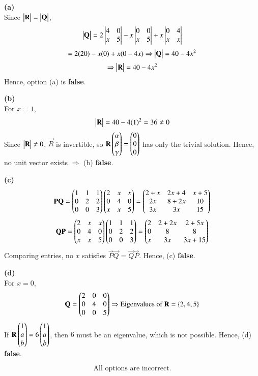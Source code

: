 \documentclass[journal]{IEEEtran}
\begin{document}
\textbf{(a)}\\[-2mm]
Since $\begin{vmatrix}\mathbf{R}\end{vmatrix}=\begin{vmatrix}\mathbf{Q}\end{vmatrix}$,  
\[
\begin{vmatrix}\mathbf{Q}\end{vmatrix} =
2\begin{vmatrix}4 & 0\\ x & 5\end{vmatrix}
- x\begin{vmatrix}0 & 0\\ x & 5\end{vmatrix}
+ x\begin{vmatrix}0 & 4\\ x & x\end{vmatrix}
\]
\[
= 2(20) - x(0) + x(0 - 4x)
\Rightarrow \begin{vmatrix}\mathbf{Q}\end{vmatrix} = 40 - 4x^2
\]
\[
\Rightarrow \begin{vmatrix}\mathbf{R}\end{vmatrix} = 40 - 4x^2
\]
Hence, option (a) is \textbf{false}.

\textbf{(b)}\\[-2mm]
For $x=1$,
\[
\begin{vmatrix}\mathbf{R}\end{vmatrix} = 40 - 4(1)^2 = 36 \neq 0
\]
Since $\begin{vmatrix}\mathbf{R}\end{vmatrix} \neq 0$, $\vec{R}$ is invertible,  
so $\mathbf{R}\begin{pmatrix}\alpha\\ \beta\\ \gamma\end{pmatrix} = \begin{pmatrix}0\\ 0\\ 0\end{pmatrix}$  
has only the trivial solution.  
Hence, no unit vector exists $\Rightarrow$ (b) \textbf{false}.

\textbf{(c)}\\[-2mm]
\[
\mathbf{P}\mathbf{Q}
=\begin{pmatrix}1 & 1 & 1\\ 0 & 2 & 2\\ 0 & 0 & 3\end{pmatrix}
\begin{pmatrix}2 & x & x\\ 0 & 4 & 0\\ x & x & 5\end{pmatrix}
=\begin{pmatrix}2+x & 2x+4 & x+5\\ 2x & 8+2x & 10\\ 3x & 3x & 15\end{pmatrix}
\]
\[
\mathbf{Q}\mathbf{P}
=\begin{pmatrix}2 & x & x\\ 0 & 4 & 0\\ x & x & 5\end{pmatrix}
\begin{pmatrix}1 & 1 & 1\\ 0 & 2 & 2\\ 0 & 0 & 3\end{pmatrix}
=\begin{pmatrix}2 & 2+2x & 2+5x\\ 0 & 8 & 8\\ x & 3x & 3x+15\end{pmatrix}
\]
Comparing entries, no $x$ satisfies $\vec{P}\vec{Q}=\vec{Q}\vec{P}$.  
Hence, (c) \textbf{false}.

\textbf{(d)}\\[-2mm]
For $x=0$,
\[
\mathbf{Q}=\begin{pmatrix}2 & 0 & 0\\ 0 & 4 & 0\\ 0 & 0 & 5\end{pmatrix}
\Rightarrow \text{Eigenvalues of }\mathbf{R}=\{2,4,5\}
\]
If $\mathbf{R}\begin{pmatrix}1\\ a\\ b\end{pmatrix}=6\begin{pmatrix}1\\ a\\ b\end{pmatrix}$,  
then $6$ must be an eigenvalue, which is not possible.  
Hence, (d) \textbf{false}.

\[
\boxed{\text{All options are incorrect.}}
\]
\end{document}
